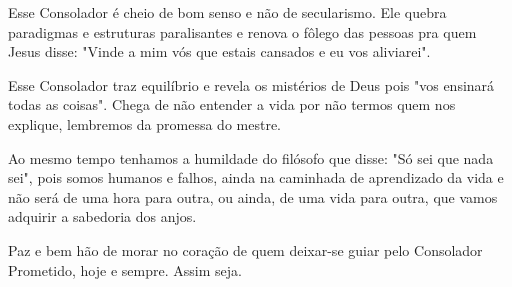 Esse Consolador é cheio de bom senso e não de secularismo. Ele quebra paradigmas e estruturas paralisantes e renova o fôlego das pessoas pra quem Jesus disse: "Vinde a mim vós que estais cansados e eu vos aliviarei".

Esse Consolador traz equilíbrio e revela os mistérios de Deus pois "vos ensinará todas as coisas". Chega de não entender a vida por não termos quem nos explique, lembremos da promessa do mestre.

Ao mesmo tempo tenhamos a humildade do filósofo que disse: "Só sei que nada sei", pois somos humanos e falhos, ainda na caminhada de aprendizado da vida e não será de uma hora para outra, ou ainda, de uma vida para outra, que vamos adquirir a sabedoria dos anjos.

Paz e bem hão de morar no coração de quem deixar-se guiar pelo Consolador Prometido, hoje e sempre. Assim seja.